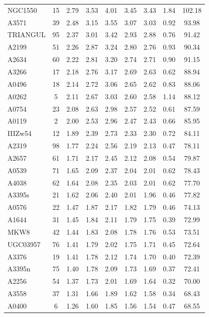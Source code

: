 \documentclass[10pt,aps,pra,reprint,amsmath,amsfonts,amssymb,showpacs,nofootinbib,floatfix]{revtex4-1}
\begin{document}
\begin{table}
\begin{minipage}{2.0\columnwidth}
\begin{tabular}{l c c c c c c c c}
NGC1550 & 15 & 2.79 & 3.53 & 4.01 & 3.45 & 3.43 & 1.84 & 102.18 \\
A3571 & 39 & 2.48 & 3.15 & 3.55 & 3.07 & 3.03 & 0.92 & 93.98 \\
TRIANGUL & 95 & 2.37 & 3.01 & 3.42 & 2.93 & 2.88 & 0.76 & 91.42 \\
A2199 & 51 & 2.26 & 2.87 & 3.24 & 2.80 & 2.76 & 0.93 & 90.34 \\
A2634 & 60 & 2.22 & 2.81 & 3.20 & 2.74 & 2.71 & 0.90 & 91.15 \\
A3266 & 17 & 2.18 & 2.76 & 3.17 & 2.69 & 2.63 & 0.62 & 88.94 \\
A0496 & 18 & 2.14 & 2.72 & 3.06 & 2.65 & 2.62 & 0.83 & 88.06 \\
A0262 & 5 & 2.11 & 2.67 & 3.03 & 2.60 & 2.58 & 1.14 & 88.12 \\
A0754 & 23 & 2.08 & 2.63 & 2.98 & 2.57 & 2.52 & 0.61 & 87.59 \\
A0119 & 2 & 2.00 & 2.53 & 2.96 & 2.47 & 2.43 & 0.66 & 85.95 \\
IIIZw54 & 12 & 1.89 & 2.39 & 2.73 & 2.33 & 2.30 & 0.72 & 84.11 \\
A2319 & 98 & 1.77 & 2.24 & 2.56 & 2.19 & 2.13 & 0.47 & 78.11 \\
A2657 & 61 & 1.71 & 2.17 & 2.45 & 2.12 & 2.08 & 0.54 & 79.87 \\
A0539 & 71 & 1.65 & 2.09 & 2.37 & 2.04 & 2.01 & 0.62 & 78.43 \\
A4038 & 62 & 1.64 & 2.08 & 2.35 & 2.03 & 2.01 & 0.62 & 77.70 \\
A3395s & 21 & 1.62 & 2.06 & 2.40 & 2.01 & 1.96 & 0.46 & 77.82 \\
A0576 & 22 & 1.47 & 1.87 & 2.17 & 1.82 & 1.79 & 0.46 & 74.13 \\
A1644 & 31 & 1.45 & 1.84 & 2.11 & 1.79 & 1.75 & 0.39 & 72.99 \\
MKW8 & 42 & 1.44 & 1.83 & 2.08 & 1.78 & 1.76 & 0.53 & 73.51 \\
UGC03957 & 76 & 1.41 & 1.79 & 2.02 & 1.75 & 1.71 & 0.45 & 72.64 \\
A3376 & 19 & 1.41 & 1.78 & 2.12 & 1.74 & 1.70 & 0.40 & 72.39 \\
A3395n & 75 & 1.40 & 1.78 & 2.09 & 1.73 & 1.69 & 0.37 & 72.41 \\
A2256 & 54 & 1.37 & 1.73 & 2.01 & 1.69 & 1.64 & 0.32 & 70.00 \\
A3558 & 37 & 1.31 & 1.66 & 1.89 & 1.62 & 1.58 & 0.34 & 68.43 \\
A0400 & 6 & 1.26 & 1.60 & 1.85 & 1.56 & 1.54 & 0.47 & 68.55 \\

\end{tabular}
\end{minipage}
\end{table}
\end{document}
